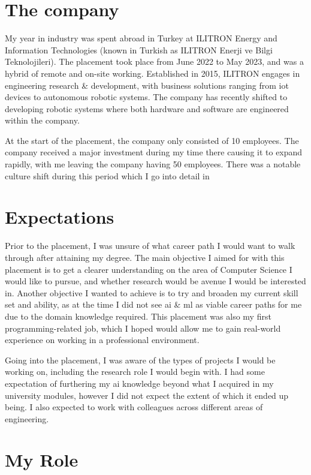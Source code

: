 \section{The company}

My year in industry was spent abroad in Turkey at ILITRON Energy and Information Technologies
(known in Turkish as ILITRON Enerji ve Bilgi Teknolojileri).
The placement took place from June 2022 to May 2023, and was a hybrid of remote and on-site working.
Established in 2015, ILITRON engages in engineering research \& development,
with business solutions ranging from \gls*{iot} devices to autonomous robotic systems.
The company has recently shifted to developing robotic systems where
both hardware and software are engineered within the company.

At the start of the placement, the company only consisted of 10 employees.
The company received a major investment during my time there causing it to expand rapidly,
with me leaving the company having 50 employees.
There was a notable culture shift during this period which I go into detail in %

\section{Expectations}

Prior to the placement, I was unsure of what career path I would want to walk through after attaining my degree.
The main objective I aimed for with this placement is to get a clearer understanding
on the area of Computer Science I would like to pursue,
and whether research would be avenue I would be interested in.
Another objective I wanted to achieve is to try and broaden my current skill set and ability,
as at the time I did not see \gls*{ai} \& \gls*{ml} as viable career paths for me
due to the domain knowledge required.
This placement was also my first programming-related job,
which I hoped would allow me to gain real-world experience on working in a professional environment.

Going into the placement, I was aware of the types of projects I would be working on,
including the research role I would begin with.
I had some expectation of furthering my \gls*{ai} knowledge
beyond what I acquired in my university modules,
however I did not expect the extent of which it ended up being.
I also expected to work with colleagues across different areas of engineering.

\section{My Role}


